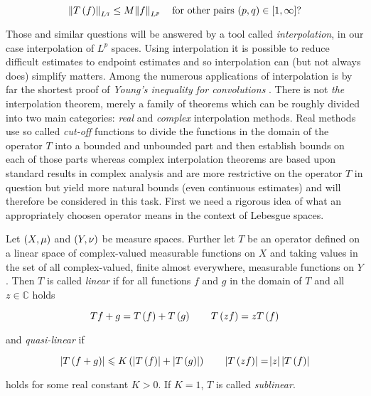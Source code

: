 \begin{equation*}
	\norm[0]{T\del{f}}_{L^q} \leq M \norm{f}_{L^p} \quad \text{for other pairs $\del{p,q} \in \intcc{1,\infty}$?} 
\end{equation*}

Those and similar questions will be answered by a tool called \emph{interpolation}, in our case interpolation of $L^p$ spaces. Using interpolation it is possible to reduce difficult estimates to endpoint estimates and so interpolation can (but not always does) simplify matters. Among the numerous applications of interpolation is by far the shortest proof of \emph{Young's inequality for convolutions} \textup{\cite[22--23]{grafakos:fourier:2014}}. There is not \emph{the} interpolation theorem, merely a family of theorems which can be 
roughly divided into two main categories: \emph{real} and \emph{complex} interpolation methods. Real methods use so called \emph{cut-off} functions to divide the functions in the domain of the operator $T$ into a bounded and unbounded part and then establish bounds on each of those parts whereas complex interpolation theorems are based upon standard results in complex analysis and are more restrictive on the operator $T$ in question but yield more natural bounds (even continuous estimates) and will therefore be considered in this task. First we need a rigorous idea of what an appropriately choosen operator means in the context of Lebesgue spaces. 

\vspace{2mm}

\begin{mdframed}
	\begin{definition}
		Let $\del{X,\mu}$ and $\del{Y,\nu}$ be measure spaces. Further let $T$ be an operator defined on a linear space of complex-valued measurable functions on $X$ and taking values in the set of all complex-valued, finite almost everywhere, measurable functions on $Y$. Then $T$ is called \emph{linear} if for all functions $f$ and $g$ in the domain of $T$ and all $z \in \mathbb{C}$ holds

		\begin{equation}
			T{f + g} = T\del{f} + T\del{g} \qquad T\del{zf} = zT\del{f}
			\label{eq:linear}
		\end{equation}

		\noindent and \emph{quasi-linear} if

		\begin{equation}
			\abs[0]{T \del{f + g}} \leqslant K \del[0]{\abs[0]{ T\del{f}} + \abs[0]{ T\del{g}}} \qquad \abs[0]{ T\del{zf} } = \abs{z}\abs[0]{ T\del{f}}
			\label{eq:quasilinear}
		\end{equation}

		\noindent holds for some real constant $K > 0$. If $K = 1$, $T$ is called \emph{sublinear}.
	\end{definition}
\end{mdframed}

